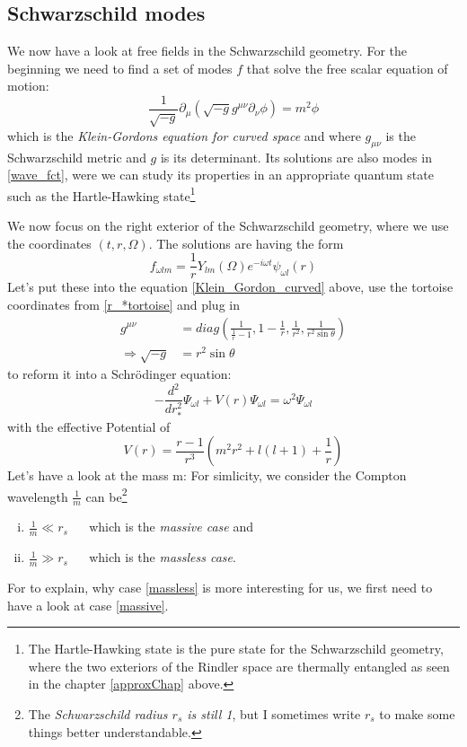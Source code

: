 \subsection{Schwarzschild modes \checkmark}
	We now have a look at free fields in the Schwarzschild geometry. For the beginning we need to find a set of modes $f$ that solve the free scalar equation of motion:
		\begin{equation} \label{Klein_Gordon_curved}
			\frac{1}{\sqrt{-g}} \partial_\mu (\sqrt{-g} g^{\mu \nu} \partial_\nu \phi)
			= m^2 \phi
		\end{equation}
	which is the \textit{Klein-Gordons equation for curved space} and where $g_{\mu \nu}$ is the Schwarzschild metric and $g$ is its determinant. Its solutions are also modes in \eqref{wave_fct}, were we can study its properties in an appropriate quantum state such as the Hartle-Hawking state\footnote{The Hartle-Hawking state is the pure state for the Schwarzschild geometry, where the two exteriors of the Rindler space are thermally entangled as seen in the chapter \ref{approxChap} above.}
	
	We now focus on the right exterior of the Schwarzschild geometry, where we use the coordinates $(t,r, \Omega)$. The solutions are having the form
		\begin{equation}
			f_{\omega l m} = 
			\frac{1}{r} Y_{l m}(\Omega) e^{-i \omega t} \psi_{\omega l}(r)
		\end{equation}
	Let's put these into the equation \eqref{Klein_Gordon_curved} above, use the tortoise coordinates from \eqref{r_*tortoise} and plug in
		\begin{align*}
			g^{\mu \nu} &= diag \left(
				\frac{1}{\frac{1}{r}-1},
				1 - \frac{1}{r},
				\frac{1}{r^2},
				\frac{1}{r^2 \sin \theta}
			\right) \\
			\Rightarrow \sqrt{-g}&= r^2 \sin \theta
		\end{align*}
	to reform it into a Schrödinger equation:
		\begin{equation} \label{schroedinger_eq}
			- \frac{d^2}{dr^2_*} \Psi_{\omega l} 
			+ V(r) \Psi_{\omega l} 
			= \omega^2 \Psi_{\omega l}
		\end{equation}
	with the effective Potential of
		\begin{equation}
			V(r)=
			\frac{r-1}{r^3} \left( m^2r^2 + l(l+1) + \frac{1}{r}
			\right)
		\end{equation}
	Let's have a look at the mass m: For simlicity, we consider the Compton wavelength $\frac{1}{m}$ can be\footnote{ The \textit{Schwarzschild radius $r_s$ is still 1}, but I sometimes write $r_s$ to make some things better understandable.} 
		\begin{enumerate}[(i)]
			\item $\frac{1}{m} \ll r_s$	~~ which is the \textit{massive case} and \label{massive}
			\item $\frac{1}{m} \gg r_s$	~~ which is the \textit{massless case}. \label{massless}
		\end{enumerate}
	For to explain, why case \eqref{massless} is more interesting for us, we first need to have a look at case \eqref{massive}.
	
